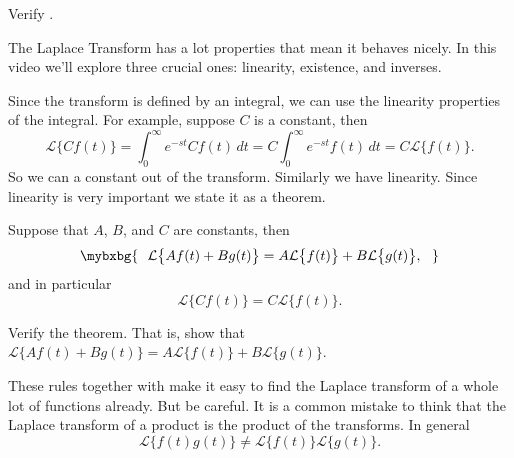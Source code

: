 \begin{exercise}
Verify .
\end{exercise}
\begin{video}
	The Laplace Transform has a lot properties that mean it behaves nicely. In this video we'll explore three crucial ones: linearity, existence, and inverses. 
\end{video}

Since the transform is defined by an integral, we can use the linearity
properties of the integral.  For example, suppose $C$ is a constant, then
\begin{equation*}
\mathcal{L} \bigl\{ C f(t) \bigr\} =
\int_0^\infty e^{-st} C f(t) \,dt =
C \int_0^\infty e^{-st} f(t) \,dt =
C \mathcal{L} \bigl\{ f(t) \bigr\} .
\end{equation*}
So we can  a constant out of the transform.  Similarly  we have
linearity.
Since linearity is very important we state it as a theorem.

\begin{theorem}
Suppose that $A$, $B$, and $C$ are constants, then
\begin{equation*}
\mybxbg{~~
\mathcal{L} \bigl\{ A f(t) + B g(t) \bigr\} =
A \mathcal{L} \bigl\{ f(t) \bigr\} +
B \mathcal{L} \bigl\{ g(t) \bigr\} ,
~~}
\end{equation*}
and in particular
\begin{equation*}
\mathcal{L} \bigl\{ C f(t) \bigr\} =
C \mathcal{L} \bigl\{ f(t) \bigr\} .
\end{equation*}
\end{theorem}

\begin{exercise}
Verify the theorem.  That is, show that
$\mathcal{L} \bigl\{ A f(t) + B g(t) \bigr\} =
A \mathcal{L} \bigl\{ f(t) \bigr\} +
B \mathcal{L} \bigl\{ g(t) \bigr\}$.
\end{exercise}

These rules together with  make it easy to find
the Laplace transform of a whole lot of functions already.
But be careful.
It is a common mistake to think that the Laplace transform of a product
is the product of the transforms.  In general 
\begin{equation*}
\mathcal{L} \bigl\{ f(t) g(t) \bigr\} \not=
\mathcal{L} \bigl\{ f(t) \bigr\}
\mathcal{L} \bigl\{ g(t) \bigr\} .
\end{equation*}

